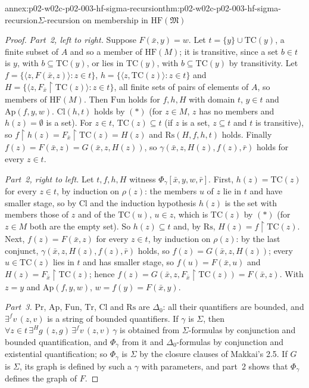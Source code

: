 \begin{annexitem}{annex:p02-w02c-p02-003-hf-sigma-recursion}{thm:p02-w02c-p02-003-hf-sigma-recursion}{\(\Sigma\)-recursion on membership in \(\mathrm{HF}(\mathfrak M)\)}
\begin{proof}
\emph{Part~2, left to right.}  Suppose \(F(\bar x,y)=w\).  Let
\(t=\{y\}\cup\mathrm{TC}(y)\), a finite subset of \(A\) and so a member of
\(\mathrm{HF}(M)\); it is transitive, since a set \(b\in t\) is \(y\),
with \(b\subseteq\mathrm{TC}(y)\), or lies in \(\mathrm{TC}(y)\), with
\(b\subseteq\mathrm{TC}(y)\) by transitivity.  Let
\(f=\{\langle z,F(\bar x,z)\rangle:z\in t\}\),
\(h=\{\langle z,\mathrm{TC}(z)\rangle:z\in t\}\) and
\(H=\{\langle z,F_{\bar x}\restriction\mathrm{TC}(z)\rangle:z\in t\}\),
all finite sets of pairs of elements of \(A\), so members of
\(\mathrm{HF}(M)\).  Then \(\mathrm{Fun}\) holds for \(f,h,H\) with domain
\(t\), \(y\in t\) and \(\mathrm{Ap}(f,y,w)\).  \(\mathrm{Cl}(h,t)\) holds
by \((\ast)\) (for \(z\in M\), \(z\) has no members and
\(h(z)=\emptyset\) is a set).  For \(z\in t\),
\(\mathrm{TC}(z)\subseteq t\) (if \(z\) is a set, \(z\subseteq t\) and
\(t\) is transitive), so \(f\restriction h(z)=F_{\bar
x}\restriction\mathrm{TC}(z)=H(z)\) and \(\mathrm{Rs}(H,f,h,t)\) holds.
Finally \(f(z)=F(\bar x,z)=G(\bar x,z,H(z))\), so \(\gamma(\bar
x,z,H(z),f(z),\bar r)\) holds for every \(z\in t\).

\emph{Part~2, right to left.}  Let \(t,f,h,H\) witness
\(\Phi_\gamma[\bar x,y,w,\bar r]\).  First, \(h(z)=\mathrm{TC}(z)\) for
every \(z\in t\), by induction on \(\rho(z)\): the members \(u\) of \(z\)
lie in \(t\) and have smaller stage, so by \(\mathrm{Cl}\) and the
induction hypothesis \(h(z)\) is the set with members those of \(z\) and
of the \(\mathrm{TC}(u)\), \(u\in z\), which is \(\mathrm{TC}(z)\) by
\((\ast)\) (for \(z\in M\) both are the empty set).  So
\(h(z)\subseteq t\) and, by \(\mathrm{Rs}\),
\(H(z)=f\restriction\mathrm{TC}(z)\).  Next, \(f(z)=F(\bar x,z)\) for
every \(z\in t\), by induction on \(\rho(z)\): by the last conjunct,
\(\gamma(\bar x,z,H(z),f(z),\bar r)\) holds, so \(f(z)=G(\bar x,z,H(z))\);
every \(u\in\mathrm{TC}(z)\) lies in \(t\) and has smaller stage, so
\(f(u)=F(\bar x,u)\) and \(H(z)=F_{\bar x}\restriction\mathrm{TC}(z)\);
hence \(f(z)=G(\bar x,z,F_{\bar x}\restriction\mathrm{TC}(z))=F(\bar
x,z)\).  With \(z=y\) and \(\mathrm{Ap}(f,y,w)\), \(w=f(y)=F(\bar x,y)\).

\emph{Part~3.}  \(\mathrm{Pr}\), \(\mathrm{Ap}\), \(\mathrm{Fun}\),
\(\mathrm{Tr}\), \(\mathrm{Cl}\) and \(\mathrm{Rs}\) are
\(\Delta_0\): all their quantifiers are bounded, and
\(\exists^{f}v\,(z,v)\) is a string of bounded quantifiers.  If
\(\gamma\) is \(\Sigma\), then
\(\forall z\in t\,\exists^{H}g\,(z,g)\,\exists^{f}v\,(z,v)\,\gamma\) is
obtained from \(\Sigma\)-formulas by conjunction and bounded
quantification, and \(\Phi_\gamma\) from it and \(\Delta_0\)-formulas
by conjunction and existential quantification; so \(\Phi_\gamma\) is
\(\Sigma\) by the closure clauses of Makkai's 2.5.  If \(G\) is
\(\Sigma\), its graph is defined by such a \(\gamma\) with parameters, and
part~2 shows that \(\Phi_\gamma\) defines the graph of \(F\).


\end{proof}
\end{annexitem}
